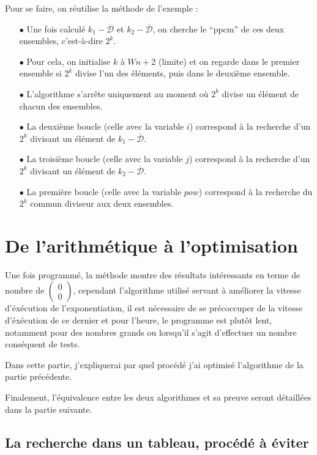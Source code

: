\documentclass[12pt, a4paper]{memoir}
\newcommand{\doublezero}{\begin{pmatrix} 0 \\ 0 \end{pmatrix}}
\newcommand{\dbarre}{\overline{\mathcal{D}}}
\begin{document}
Pour se faire, on réutilise la méthode de l'exemple : \\
\begin{itemize}
 \item [$\bullet$] Une fois calculé $k_1 - \dbarre$ et $k_2 - \dbarre$, on cherche le ``ppcm'' de ces deux ensembles, c'est-à-dire $2^k$.
 \item [$\bullet$] Pour cela, on initialise $k$ à $Wn+2$ (limite) et on regarde dans le premier ensemble si $2^k$ divise l'un des éléments,
 puis dans le deuxième ensemble.
 \item [$\bullet$] L'algorithme s'arrête uniquement au moment où $2^k$ divise un élément de chacun des ensembles.
 \item [$\bullet$] La deuxième boucle (celle avec la variable $i$) correspond à la recherche d'un $2^k$ divisant un élément de $k_1 - \dbarre$.
 \item [$\bullet$] La troisième boucle (celle avec la variable $j$) correspond à la recherche d'un $2^k$ divisant un élément de $k_2 - \dbarre$.
 \item [$\bullet$] La première boucle (celle avec la variable $pow$) correspond à la recherche du $2^k$ commun diviseur aux deux ensembles.
 \end{itemize}

 \section{De l'arithmétique à l'optimisation}
   
Une fois programmé, la méthode montre des résultats intéressants en terme de nombre de $\doublezero$, cependant 
l'algorithme utilisé servant à améliorer la vitesse d'éxécution de l'exponentiation, il est nécessaire de se précoccuper
de la vitesse d'éxécution de ce dernier et pour l'heure, le programme est plutôt lent, notamment pour des nombres grands
ou lorsqu'il s'agit d'effectuer un nombre conséquent de tests.

Dans cette partie, j'expliquerai par quel procédé j'ai optimisé l'algorithme de la partie précédente.

Finalement, l'équivalence entre les deux algorithmes et sa preuve seront détaillées dans la partie suivante.

    \subsection{La recherche dans un tableau, procédé à éviter}
    
\end{document}

